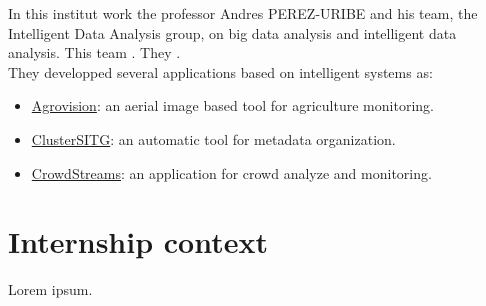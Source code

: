 \documentclass[12pt, a4paper]{report}
\begin{document}
			In this institut work the professor Andres PEREZ-URIBE and his team, the Intelligent Data Analysis group, on big data analysis and intelligent data analysis.
			This team .
			They .\\
			They developped several applications based on intelligent systems as:
			\begin{itemize}
				\item \href{http://iict.heig-vd.ch/projets#/49/agrovision-developpement-dun-outil-de-suivi-base-sur-limagerie-aerienne-a-haute-resolution-pour-une-meilleure-gestion-agronomique-et-environnementale-de-lagriculture}{Agrovision}: an aerial image based tool for agriculture monitoring.
				\item \href{http://iict.heig-vd.ch/projets#/47/clustersitg-semantic-analysis-and-clustering-of-sitg-catalogue}{ClusterSITG}: an automatic tool for metadata organization.
				\item \href{http://iict.heig-vd.ch/projets#/43/crowdstreams-analyse-et-surveillance-en-temps-r-el-de-mobilit-la-proximit-des-grands-v-nements}{CrowdStreams}: an application for crowd analyze and monitoring.
			\end{itemize}

			\section{Internship context}
			Lorem ipsum.
\end{document}
